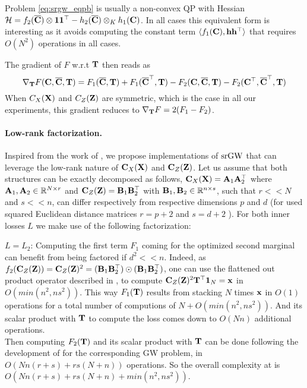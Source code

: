 Problem \ref{eq:srgw_eqpb} is usually a non-convex QP with Hessian $\mathcal{H} = f_2(\overline{{\mathbf{C}}}) \otimes \bm{1}\bm{1}^\top - h_2(\overline{{\mathbf{C}}}) \otimes_K h_1({\mathbf{C}})$. In all cases this equivalent form is interesting as it avoids computing the constant term $\langle f_1({\mathbf{C}}) , {\mathbf{h}} {\mathbf{h}}^\top \rangle $ that requires $O(N^2)$ operations in all cases.

The gradient of $F$ w.r.t ${\mathbf{T}}$ then reads as 
\begin{equation}\label{eq:srgw_gradient}
\nabla_{{\mathbf{T}}} F({\mathbf{C}}, \overline{{\mathbf{C}}}, {\mathbf{T}}) = F_1(\overline{{\mathbf{C}}}, {\mathbf{T}}) +  F_1(\overline{{\mathbf{C}}}^\top, {\mathbf{T}}) - F_2({\mathbf{C}}, \overline{{\mathbf{C}}}, {\mathbf{T}}) -F_2({\mathbf{C}}^\top, \overline{{\mathbf{C}}}^\top, {\mathbf{T}}) 
\end{equation}
When $C_X({\mathbf{X}})$ and $C_Z({\mathbf{Z}})$ are symmetric, which is the case in all our experiments,  this gradient reduces to $\nabla_{{\mathbf{T}}} F = 2(F_1 - F_2)$.

\paragraph{Low-rank factorization.} Inspired from the work of \cite{scetbon2022linear}, we propose implementations of $\operatorname{srGW}$ that can leverage the low-rank nature of ${\mathbf{C}}_X({\mathbf{X}})$ and ${\mathbf{C}}_Z({\mathbf{Z}})$. Let us assume that both structures can be exactly decomposed as follows, ${\mathbf{C}}_X({\mathbf{X}}) = {\mathbf{A}}_1 {\mathbf{A}}_2^\top$ where ${\mathbf{A}}_1, {\mathbf{A}}_2 \in \mathbb{R}^{N \times r}$ and ${\mathbf{C}}_Z({\mathbf{Z}}) = {\mathbf{B}}_1 {\mathbf{B}}_2^\top$ with ${\mathbf{B}}_1, {\mathbf{B}}_2 \in \mathbb{R}^{n \times s}$, such that $r << N$ and $s << n$, can differ respectively from respective dimensions $p$ and $d$ (\eg for used squared Euclidean distance matrices $r=p+2$ and $s=d +2$ ). For both inner losses $L$ we make use of the following factorization:

\underline{$L=L_2$}: Computing the first term $F_1$ coming for the optimized second marginal can benefit from being factored if $d^2 << n$. Indeed, as $f_2({\mathbf{C}}_Z({\mathbf{Z}})) = {\mathbf{C}}_Z({\mathbf{Z}})^2 = ({\mathbf{B}}_1 {\mathbf{B}}_2^\top) \odot ({\mathbf{B}}_1 {\mathbf{B}}_2^\top)$, one can use the flattened out product operator described in \cite[Section 5]{scetbon2022linear}, to compute ${\mathbf{C}}_Z({\mathbf{Z}})^2 {\mathbf{T}}^\top \bm{1}_N = {\mathbf{x}}$ in $O(min(n^2, ns^2))$. This way $F_1({\mathbf{T}})$ results from stacking $N$ times ${\mathbf{x}}$ in $O(1)$ operations for a total number of computions of $N + O(min(n^2, ns^2))$.%
And its scalar product with ${\mathbf{T}}$ to compute the loss comes down to $O(Nn)$ additional operations. \\
Then computing $F_2({\mathbf{T}})$ and its scalar product with ${\mathbf{T}}$ can be done following the development of \cite[Section 3]{scetbon2022linear} for the corresponding GW problem, in $O(Nn(r + s) + rs(N+n))$ operations. So the overall complexity at is $O(Nn(r + s) + rs(N+n) + min(n^2, ns^2))$.


